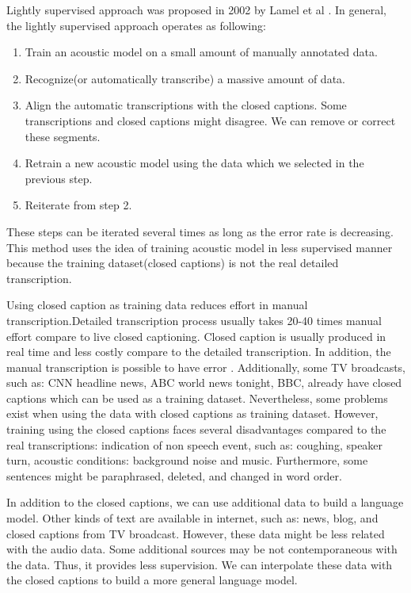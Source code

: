 Lightly supervised approach was proposed in 2002 by Lamel et al \cite{lightlySupervised}. 
In general, the lightly supervised approach operates as following:
\begin{enumerate}
\item Train an acoustic model on a small amount of manually annotated data. 
\item Recognize(or automatically transcribe) a massive amount of data.
\item Align the automatic transcriptions with the closed captions. Some transcriptions and closed captions might disagree. We can remove or correct these segments.
\item Retrain a new acoustic model using the data which we selected in the previous step. 
\item Reiterate from step 2.
\end{enumerate}
These steps can be iterated several times as long as the error rate is decreasing. This method uses the idea of training acoustic model in less supervised manner because the training dataset(closed captions) is not the real detailed transcription. 

Using closed caption as training data reduces effort in manual transcription.Detailed transcription process usually takes 20-40 times manual effort compare to live closed captioning. Closed caption is usually produced in real time and less costly compare to the detailed transcription. In addition, the manual transcription is possible to have error \cite{Barras2001}. Additionally, some TV broadcasts, such as: CNN headline news, ABC world news tonight, BBC, already have closed captions which can be used as a training dataset. Nevertheless, some problems exist when using the data with closed captions as training dataset. However, training using  the closed captions faces several disadvantages compared to the real transcriptions: indication of non speech event, such as: coughing, speaker turn, acoustic conditions: background noise and music. Furthermore, some sentences might be paraphrased, deleted, and changed in word order. 

In addition to the closed captions, we can use additional data to build a language model. Other kinds of text are available in internet, such as: news, blog, and closed captions from TV broadcast. However, these data might be less related with the audio data. Some additional sources may be not contemporaneous with the data. Thus, it provides less supervision. We can interpolate these data with the closed captions to build a more general language model.

